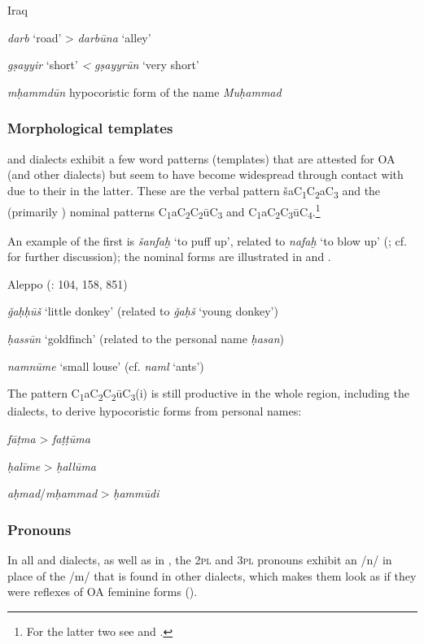 \documentclass[output=paper]{langsci/langscibook}
\begin{document}
\ea\label{una}
Iraq \citep[72]{Masliyah1997}

\textit{darb} ‘road’ > \textit{darbūna} ‘alley’

\textit{gṣayyir} ‘short’ \textit{<} \textit{gṣayyrūn} ‘very short’

\textit{mḥammdūn} hypocoristic form of the name \textit{Muḥammad}
\z

\subsubsection{Morphological templates}
 and  dialects exhibit a few word patterns (templates) that are attested for OA (and other dialects) but seem to have become widespread through contact with  due to their  in the latter. These are the verbal pattern šaC\textsubscript{1}C\textsubscript{2}aC\textsubscript{3} and the (primarily ) nominal patterns C\textsubscript{1}aC\textsubscript{2}C\textsubscript{2}ūC\textsubscript{3} and C\textsubscript{1}aC\textsubscript{2}C\textsubscript{3}ūC\textsubscript{4}.\footnote{For the latter two see \citet{Corriente1969} and \citet{Procházka2004}.}\textsubscript{} 

An example of the first is \textit{šanfaḫ} ‘to puff up’, related to \textit{nafaḫ} ‘to blow up’ (\citealt[83]{Féghali1918}; cf. \citealt[201]{Lentin2018} for further discussion); the nominal forms are illustrated in  and .

\ea\label{donkey}
Aleppo (\citealt{Barthélemy1935}: 104, 158, 851) 

\textit{ǧaḥḥūš} ‘little donkey’ (related to \textit{ǧaḥš} `young donkey')

\textit{ḥassūn} ‘goldfinch’ (related to the personal name \textit{ḥasan})

\textit{namnūme} ‘small louse’ (cf. \textit{naml} `ants')
\z

The pattern C\textsubscript{1}aC\textsubscript{2}C\textsubscript{2}ūC\textsubscript{3}(i)\textsubscript{} is still productive in the whole region, including the  dialects, to derive hypocoristic forms from personal names:

\ea\label{fatima}
\textit{fāṭma} > \textit{faṭṭūma}

\textit{ḥalīme} > \textit{ḥallūma}

\textit{aḥmad}/\textit{mḥammad} > \textit{ḥammūdi} 
\z

\subsubsection{Pronouns}
In all  and  dialects, as well as in , the \textsc{2pl} and \textsc{3pl} pronouns exhibit an /n/ in place of the /m/ that is found in other  dialects, which makes them look as if they were reflexes of OA feminine forms (). 
\end{document}
